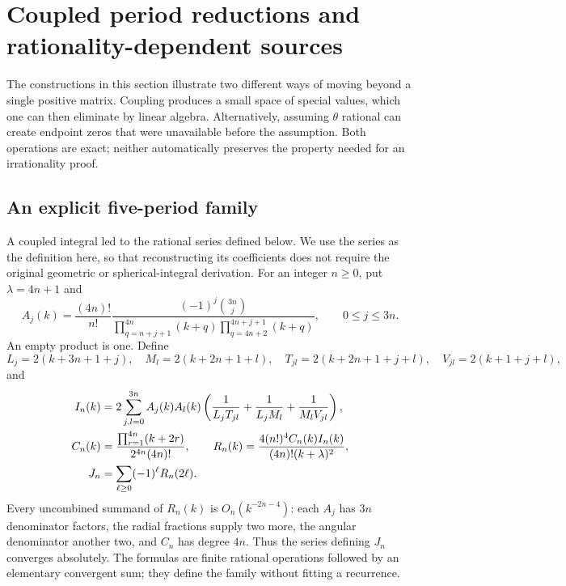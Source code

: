 \section{Coupled period reductions and rationality-dependent sources}
\label{sec:coupled-case}
The constructions in this section illustrate two different ways of
moving beyond a single positive matrix. Coupling produces a small space
of special values, which one can then eliminate by linear algebra.
Alternatively, assuming $\theta$ rational can create endpoint zeros
that were unavailable before the assumption. Both operations are exact;
neither automatically preserves the property needed for an irrationality
proof.

\subsection{An explicit five-period family}\label{subsec:five-period}
A coupled integral led to the rational series defined below. We use the
series as the definition here, so that reconstructing its coefficients
does not require the original geometric or spherical-integral derivation.
For an integer $n\geq0$, put $\lambda=4n+1$ and
\begin{equation}\label{eq:coupled-A}
 A_j(k)=\frac{(4n)!}{n!}
 \frac{(-1)^j\binom{3n}{j}}
 {\displaystyle\prod_{q=n+j+1}^{4n}(k+q)
  \displaystyle\prod_{q=4n+2}^{4n+j+1}(k+q)},\qquad 0\leq j\leq3n.
\end{equation}
An empty product is one. Define
\[
 L_j=2(k+3n+1+j),\quad M_l=2(k+2n+1+l),\quad
 T_{jl}=2(k+2n+1+j+l),\quad V_{jl}=2(k+1+j+l),
\]
and
\begin{align}
 I_n(k)&=2\sum_{j,l=0}^{3n}A_j(k)A_l(k)
 \left(\frac1{L_jT_{jl}}+\frac1{L_jM_l}+\frac1{M_lV_{jl}}\right),\notag\\
 C_n(k)&=\frac{\prod_{r=1}^{4n}(k+2r)}{2^{4n}(4n)!},\qquad
 R_n(k)=\frac{4(n!)^4C_n(k)I_n(k)}{(4n)!(k+\lambda)^2},\notag\\
 J_n&=\sum_{\ell\geq0}(-1)^\ell R_n(2\ell).
 \label{eq:coupled-R}
\end{align}
Every uncombined summand of $R_n(k)$ is $O_n(k^{-2n-4})$:
each $A_j$ has $3n$ denominator factors, the radial fractions supply
two more, the angular denominator another two, and $C_n$ has degree
$4n$. Thus the series defining $J_n$ converges absolutely. The formulas
are finite rational operations followed by an elementary convergent
sum; they define the family without fitting a recurrence.

